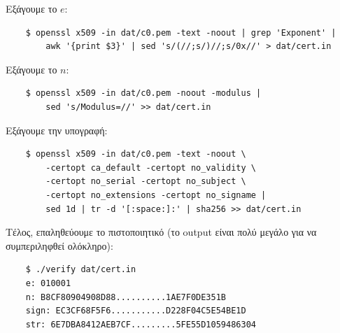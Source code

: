 \documentclass[12pt]{article}
\begin{document}
Εξάγουμε το $e$:
\begin{lstlisting}
	$ openssl x509 -in dat/c0.pem -text -noout | grep 'Exponent' |
		awk '{print $3}' | sed 's/(//;s/)//;s/0x//' > dat/cert.in
\end{lstlisting}

Εξάγουμε το $n$:
\begin{lstlisting}
	$ openssl x509 -in dat/c0.pem -noout -modulus |
		sed 's/Modulus=//' >> dat/cert.in
\end{lstlisting}

Εξάγουμε την υπογραφή:
\begin{lstlisting}
	$ openssl x509 -in dat/c0.pem -text -noout \
		-certopt ca_default -certopt no_validity \
		-certopt no_serial -certopt no_subject \
		-certopt no_extensions -certopt no_signame |
		sed 1d | tr -d '[:space:]:' | sha256 >> dat/cert.in
\end{lstlisting}

Τέλος, επαληθεύουμε το πιστοποιητικό (το output είναι πολύ μεγάλο για να
συμπεριληφθεί ολόκληρο):
\begin{lstlisting}
	$ ./verify dat/cert.in
	e: 010001
	n: B8CF80904908D88..........1AE7F0DE351B
	sign: EC3CF68F5F6...........D228F04C5E54BE1D
	str: 6E7DBA8412AEB7CF.........5FE55D1059486304
\end{lstlisting}
\end{document}
